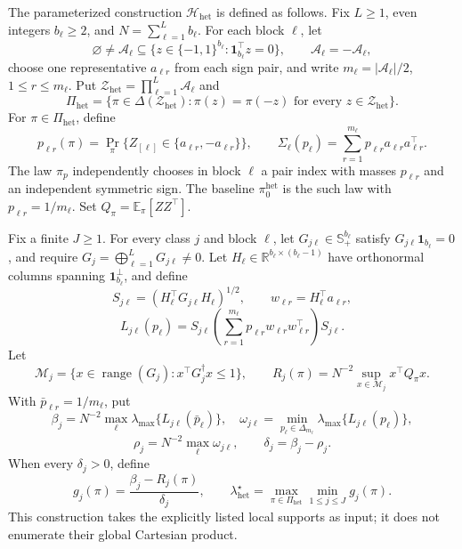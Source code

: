 The parameterized construction \(\mathcal H_{\mathrm{het}}\) is defined as follows.  Fix \(L\ge1\), even integers \(b_\ell\ge2\), and \(N=\sum_{\ell=1}^L b_\ell\).  For each block \(\ell\), let
\[
\varnothing\ne\mathcal A_\ell
\subseteq\{z\in\{-1,1\}^{b_\ell}:\mathbf 1_{b_\ell}^\top z=0\},
\qquad \mathcal A_\ell=-\mathcal A_\ell,
\]
choose one representative \(a_{\ell r}\) from each sign pair, and write \(m_\ell=|\mathcal A_\ell|/2\), \(1\le r\le m_\ell\).  Put \(\mathcal Z_{\mathrm{het}}=\prod_{\ell=1}^L\mathcal A_\ell\) and
\[
\Pi_{\mathrm{het}}
=\{\pi\in\Delta(\mathcal Z_{\mathrm{het}}):\pi(z)=\pi(-z)\text{ for every }z\in\mathcal Z_{\mathrm{het}}\}.
\]
For \(\pi\in\Pi_{\mathrm{het}}\), define
\[
p_{\ell r}(\pi)=\Pr_\pi\{Z_{[\ell]}\in\{a_{\ell r},-a_{\ell r}\}\},
\qquad
\Sigma_\ell(p_\ell)=\sum_{r=1}^{m_\ell}p_{\ell r}a_{\ell r}a_{\ell r}^\top.
\]
The law \(\pi_p\) independently chooses in block \(\ell\) a pair index with masses \(p_{\ell r}\) and an independent symmetric sign.  The baseline \(\pi_0^{\mathrm{het}}\) is the such law with \(p_{\ell r}=1/m_\ell\).  Set \(Q_\pi=\mathbb E_\pi[ZZ^\top]\).

Fix a finite \(J\ge1\).  For every class \(j\) and block \(\ell\), let \(G_{j\ell}\in\mathbb S_+^{b_\ell}\) satisfy \(G_{j\ell}\mathbf1_{b_\ell}=0\), and require \(G_j=\bigoplus_{\ell=1}^LG_{j\ell}\ne0\).  Let \(H_\ell\in\mathbb R^{b_\ell\times(b_\ell-1)}\) have orthonormal columns spanning \(\mathbf1_{b_\ell}^\perp\), and define
\[
S_{j\ell}=(H_\ell^\top G_{j\ell}H_\ell)^{1/2},
\qquad
w_{\ell r}=H_\ell^\top a_{\ell r},
\]
\[
L_{j\ell}(p_\ell)
=S_{j\ell}\left(\sum_{r=1}^{m_\ell}p_{\ell r}w_{\ell r}w_{\ell r}^\top\right)S_{j\ell}.
\]
Let
\[
\mathcal M_j=\{x\in\operatorname{range}(G_j):x^\top G_j^\dagger x\le1\},
\qquad
R_j(\pi)=N^{-2}\sup_{x\in\mathcal M_j}x^\top Q_\pi x.
\]
With \(\bar p_{\ell r}=1/m_\ell\), put
\[
\beta_j=N^{-2}\max_\ell\lambda_{\max}\{L_{j\ell}(\bar p_\ell)\},
\quad
\omega_{j\ell}=\min_{p_\ell\in\Delta_{m_\ell}}\lambda_{\max}\{L_{j\ell}(p_\ell)\},
\]
\[
\rho_j=N^{-2}\max_\ell\omega_{j\ell},
\qquad
\delta_j=\beta_j-\rho_j.
\]
When every \(\delta_j>0\), define
\[
g_j(\pi)=\frac{\beta_j-R_j(\pi)}{\delta_j},
\qquad
\lambda_{\mathrm{het}}^\star
=\max_{\pi\in\Pi_{\mathrm{het}}}\min_{1\le j\le J}g_j(\pi).
\]
This construction takes the explicitly listed local supports as input; it does not enumerate their global Cartesian product.